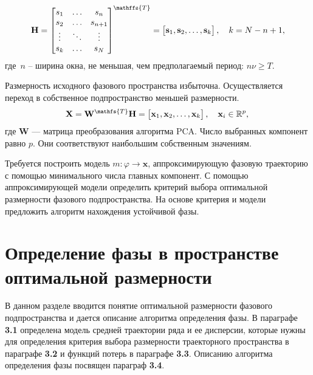 \documentclass[12pt, twoside]{article}
\theoremstyle{definition}
\def\RR{\mathbb R}
\begin{document}
    \[ \mathbf{H} = \begin{bmatrix}
                        s_1 & \dots & s_n \\
                        s_2 & \dots & s_{n+1} \\
                        \vdots  &\ddots& \vdots \\
                        s_{k} & \dots & s_{N}
                    \end{bmatrix}^{\mathffs{T}} = 
                    \begin{bmatrix}
                        \mathbf{s}_1,
                        \mathbf{s}_2, 
                        \dots,
                        \mathbf{s}_k
                    \end{bmatrix}, \quad k = N - n + 1, \]
где~$n$ -- ширина окна, не меньшая, чем предполагаемый период: $n\nu \geq T$.

Размерность исходного фазового пространства избыточна.
Осуществляется переход в собственное подпространство меньшей размерности.
    \[ \mathbf{X} = \mathbf{W}^{\mathfs{T}} \mathbf{H} = \begin{bmatrix}
                        \mathbf{x}_1,
                        \mathbf{x}_2,
                        \dots,
                        \mathbf{x}_k 
                    \end{bmatrix}, \quad \mathbf{x}_i\in \RR^p, \,  \]
где $\mathbf{W}$ --- матрица преобразования алгоритма PCA. Число выбранных компонент равно $p$. Они соответствуют наибольшим собственным значениям.

Требуется построить модель $m: \varphi \rightarrow \mathbf{x}$, аппроксимирующую фазовую траекторию с помощью минимального числа главных компонент.
С помощью аппроксимирующей модели определить критерий выбора оптимальной размерности фазового подпространства. На основе критерия и модели предложить алгоритм нахождения устойчивой фазы.
\section{Определение фазы в пространстве оптимальной размерности}
В данном разделе вводится понятие оптимальной размерности фазового подпространства и дается описание алгоритма определения фазы.
В параграфе \textbf{3.1} определена модель средней траектории ряда и ее дисперсии, которые нужны для определения критерия выбора размерности траекторного пространства в параграфе \textbf{3.2} и функций потерь в параграфе \textbf{3.3}.
Описанию алгоритма определения фазы посвящен параграф \textbf{3.4}.
\end{document}
